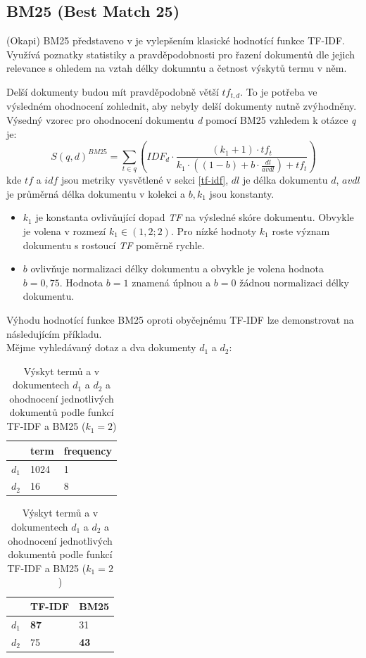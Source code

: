 \subsection{BM25 (Best Match 25)}
(Okapi) BM25 představeno v \cite{bm25} je vylepšením klasické hodnotící funkce TF-IDF. Využívá poznatky statistiky a pravděpodobnosti pro řazení dokumentů dle jejich relevance s ohledem na vztah délky dokumntu a četnost výskytů termu v něm.\par
Delší dokumenty budou mít pravděpodobně větší $tf_{t,d}$. To je potřeba ve výsledném ohodnocení zohlednit, aby nebyly delší dokumenty nutně zvýhodněny.
Výsedný vzorec pro ohodnocení dokumentu \emph{d} pomocí BM25 vzhledem k otázce \emph{q} je:
$$
    S(q,d)^{BM25} = \sum_{t \in q} \left(IDF_d \cdot \frac{(k_1+1)\cdot tf_t}{k_1\cdot ((1-b)+b \cdot \frac{dl}{avdl}) + tf_t}\right)
$$
kde $tf$ a $idf$ jsou metriky vysvětlené v sekci \ref{tf-idf}, $dl$ je délka dokumentu $d$, $avdl$ je průměrná délka dokumentu v kolekci a $b,k_1$ jsou konstanty.
\begin{itemize}
    \item $k_1$ je konstanta ovlivňující dopad \emph{TF} na výsledné skóre dokumentu. Obvykle je volena v rozmezí $k_1\in(1,2 ;2)$. Pro nízké hodnoty $k_1$ roste význam dokumentu s rostoucí \emph{TF} poměrně rychle.
    \item $b$ ovlivňuje normalizaci délky dokumentu a obvykle je volena hodnota $b=0,75$. Hodnota $b=1$ znamená úplnou a $b=0$ žádnou normalizaci délky dokumentu.
\end{itemize}

Výhodu hodnotící funkce BM25 oproti obyčejnému TF-IDF lze demonstrovat na následujícím příkladu.\\ \medskip
Mějme vyhledávaný dotaz  a dva dokumenty $d_1$ a $d_2$:\par

\begin{table}[H]
\centering
\begin{tabular}{|c|l|l|}
\hline
      & term & frequency \\ \hline
$d_1$ & 1024 & 1         \\ \hline
$d_2$ & 16   & 8         \\ \hline
\end{tabular}
\begin{tabular}{|c|l|l|}
\hline
      & \textbf{TF-IDF} & \textbf{BM25} \\ \hline
$d_1$ & \textbf{87} & 31         \\ \hline
$d_2$ & 75 & \textbf{43}         \\ \hline
\end{tabular}
\caption{Výskyt termů  a  v dokumentech $d_1$ a $d_2$ a ohodnocení jednotlivých dokumentů podle funkcí TF-IDF a BM25 ($k_1 = 2$)}
\label{tab:tf}
\end{table}

